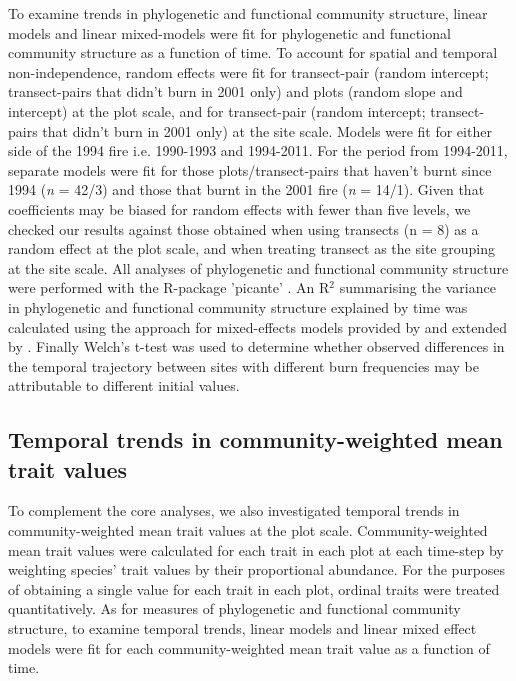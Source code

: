 To examine trends in phylogenetic and functional community structure, linear models and linear mixed-models were fit for phylogenetic and functional community structure as a function of time. To account for spatial and temporal non-independence, random effects were fit for transect-pair (random intercept; transect-pairs that didn't burn in 2001 only) and plots (random slope and intercept) at the plot scale, and for transect-pair (random intercept; transect-pairs that didn't burn in 2001 only) at the site scale. Models were fit for either side of the 1994 fire i.e. 1990-1993 and 1994-2011. For the period from 1994-2011, separate models were fit for those plots/transect-pairs that haven't burnt since 1994 (\textit{n} = 42/3) and those that burnt in the 2001 fire (\textit{n} = 14/1). Given that coefficients may be biased for random effects with fewer than five levels, we checked our results against those obtained when using transects (n = 8) as a random effect at the plot scale, and when treating transect as the site grouping at the site scale. All analyses of phylogenetic and functional community structure were performed with the R-package 'picante' \citep{Kembel2010}. An R$^{2}$ summarising the variance in phylogenetic and functional community structure explained by time was calculated using the approach for mixed-effects models provided by \citet{Nakagawa2013} and extended by \citet{Johnson2014}. Finally Welch's t-test was used to determine whether observed differences in the temporal trajectory between sites with different burn frequencies may be attributable to different initial values.

\subsection{Temporal trends in community-weighted mean trait values}

To complement the core analyses, we also investigated temporal trends in community-weighted mean trait values at the plot scale. Community-weighted mean trait values were calculated for each trait in each plot at each time-step by weighting species' trait values by their proportional abundance. For the purposes of obtaining a single value for each trait in each plot, ordinal traits were treated quantitatively. As for measures of phylogenetic and functional community structure, to examine temporal trends, linear models and linear mixed effect models were fit for each community-weighted mean trait value as a function of time. 

